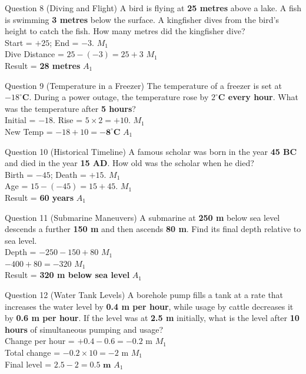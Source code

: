 \documentclass[12pt, a4paper, oneside]{article}
\begin{document}
\begin{solvingbox}{Question 8 (Diving and Flight)}
A bird is flying at \textbf{25 metres} above a lake. A fish is swimming \textbf{3 metres} below the surface. A kingfisher dives from the bird's height to catch the fish. How many metres did the kingfisher dive? \\
Start = $+25$; End = $-3$. \hfill $M_1$ \\
Dive Distance = $25 - (-3) = 25 + 3$ \hfill $M_1$ \\
Result = \textbf{28 metres} \hfill $A_1$
\end{solvingbox}

\begin{solvingbox}{Question 9 (Temperature in a Freezer)}
The temperature of a freezer is set at \textbf{$-18^\circ$C}. During a power outage, the temperature rose by \textbf{$2^\circ$C every hour}. What was the temperature after \textbf{5 hours}? \\
Initial = $-18$. Rise = $5 \times 2 = +10$. \hfill $M_1$ \\
New Temp = $-18 + 10 = \mathbf{-8^\circ C}$ \hfill $A_1$
\end{solvingbox}

\begin{solvingbox}{Question 10 (Historical Timeline)}
A famous scholar was born in the year \textbf{45 BC} and died in the year \textbf{15 AD}. How old was the scholar when he died? \\
Birth = $-45$; Death = $+15$. \hfill $M_1$ \\
Age = $15 - (-45) = 15 + 45$. \hfill $M_1$ \\
Result = \textbf{60 years} \hfill $A_1$
\end{solvingbox}

\begin{solvingbox}{Question 11 (Submarine Maneuvers)}
A submarine at \textbf{250 m} below sea level descends a further \textbf{150 m} and then ascends \textbf{80 m}. Find its final depth relative to sea level. \\
Depth = $-250 - 150 + 80$ \hfill $M_1$ \\
$-400 + 80 = -320$ \hfill $M_1$ \\
Result = \textbf{320 m below sea level} \hfill $A_1$
\end{solvingbox}

\begin{solvingbox}{Question 12 (Water Tank Levels)}
A borehole pump fills a tank at a rate that increases the water level by \textbf{0.4 m per hour}, while usage by cattle decreases it by \textbf{0.6 m per hour}. If the level was at \textbf{2.5 m} initially, what is the level after \textbf{10 hours} of simultaneous pumping and usage? \\
Change per hour = $+0.4 - 0.6 = -0.2\text{ m}$ \hfill $M_1$ \\
Total change = $-0.2 \times 10 = -2\text{ m}$ \hfill $M_1$ \\
Final level = $2.5 - 2 = \mathbf{0.5\text{ m}}$ \hfill $A_1$
\end{solvingbox}
\end{document}
